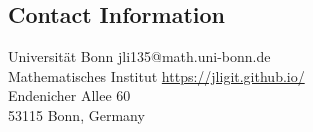 \documentclass[margin,line,pifont,palatino,courier,10pt]{res}
\begin{document}

\begin{resume}

\section{\sc Contact Information}
%

\vspace{.0in}
Universit\"at Bonn    \hfill{jli135@math.uni-bonn.de}\\
Mathematisches Institut   \hfill{\href{https://jligit.github.io/}{https://jligit.github.io/}}\\
Endenicher Allee 60 \\ %
53115 Bonn, Germany   
 



\end{resume}
\end{document}
